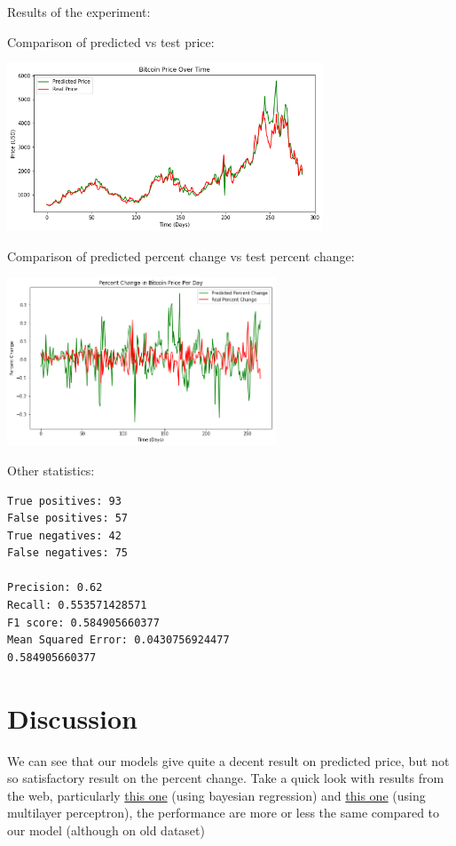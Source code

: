 \documentclass[a4paper,11pt]{article}
\begin{document}
Results of the experiment:

Comparison of predicted vs test price:

\includegraphics[height = 5cm]{ex1.png}

Comparison of predicted percent change vs test percent change:

\includegraphics[height = 5cm]{ex1_2.png}

Other statistics:
\begin{lstlisting}
True positives: 93
False positives: 57
True negatives: 42
False negatives: 75

Precision: 0.62
Recall: 0.553571428571
F1 score: 0.584905660377
Mean Squared Error: 0.0430756924477
0.584905660377
\end{lstlisting}

\section{Discussion}


We can see that our models give quite a decent result on predicted price, but not so satisfactory result on the percent change.
Take a quick look with results from the web, particularly   \href{https://www.kaggle.com/ara0303/forecasting-of-bitcoin-prices}{this one}
(using bayesian regression) and \href{https://www.kaggle.com/adamaulia/bitcoin-forecasting-using-mlp-sklearn}{this one}  (using multilayer perceptron), the performance are more or less the same compared to our model (although on old dataset)
\end{document}
